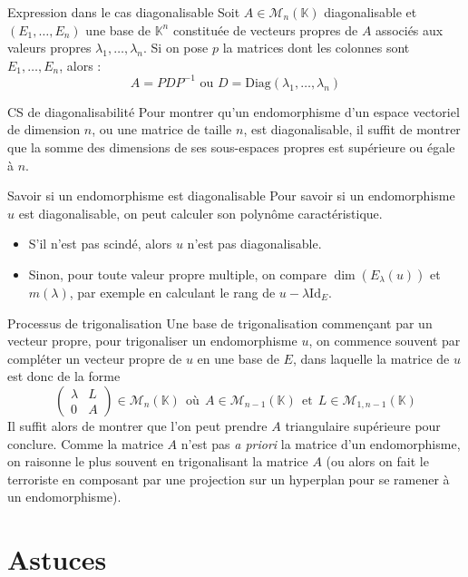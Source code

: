 \documentclass[french]{book}
\newcommand{\K}{\mathbb{K}}
\newcommand{\inv}{^{-1}}
\theoremstyle{plain}
\theoremstyle{definition}
\theoremstyle{remark}
\begin{document}
\begin{PM}{Expression dans le cas diagonalisable} Soit $A\in\mathcal{M}_n(\K)$ diagonalisable et $(E_1,\ldots,E_n)$ une base de $\K^n$ constituée de vecteurs propres de $A$ associés aux valeurs propres $\lambda_1,\ldots,\lambda_n$. Si on pose $p$ la matrices dont les colonnes sont $E_1,\ldots,E_n$, alors : $$A=PDP\inv \text{  ou  }D=\text{Diag}(\lambda_1,\ldots,\lambda_n)$$
\end{PM}
\begin{PM}{CS de diagonalisabilité} Pour montrer qu'un endomorphisme d'un espace vectoriel de dimension $n$, ou une matrice de taille $n$, est diagonalisable, il suffit de montrer que la somme des dimensions de ses sous-espaces propres est supérieure ou égale à $n$.
\end{PM}
\begin{PM}{Savoir si un endomorphisme est diagonalisable} Pour savoir si un endomorphisme $u$ est diagonalisable, on peut calculer son polynôme caractéristique.
\begin{itemize}
	\item S'il n'est pas scindé, alors $u$ n'est pas diagonalisable.
	\item Sinon, pour toute valeur propre multiple, on compare $\dim(E_\lambda(u))$ et $m(\lambda)$, par exemple en calculant le rang de $u-\lambda\text{Id}_E$.
\end{itemize}
\end{PM}
\begin{PM}{Processus de trigonalisation} Une base de trigonalisation commençant par un vecteur propre, pour trigonaliser un endomorphisme $u$, on commence souvent par compléter un vecteur propre de $u$ en une base de $E$, dans laquelle la matrice de $u$ est donc de la forme $$\begin{pmatrix}
	\lambda&L\\
	0&A
\end{pmatrix}\in\mathcal{M}_n(\K) \ \ \text{où}\ \ A\in\mathcal{M}_{n-1}(\K)\ \ \text{et} \ \ L\in\mathcal{M}_{1,n-1}(\K)$$ Il suffit alors de montrer que l'on peut prendre $A$ triangulaire supérieure pour conclure. Comme la matrice $A$ n'est pas \textit{a priori} la matrice d'un endomorphisme, on raisonne le plus souvent en trigonalisant la matrice $A$ (ou alors on fait le terroriste en composant par une projection sur un hyperplan pour se ramener à un endomorphisme).
\end{PM}
\section{Astuces}
\end{document}
